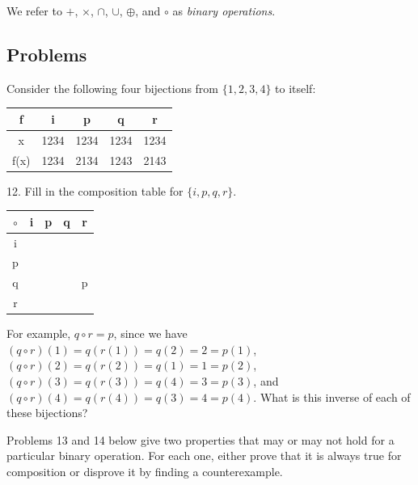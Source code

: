 \documentclass{article}
\newcommand{\0}{\mathbf 0}
\newcommand{\1}{\mathbf 1}
\begin{document}
We refer to $+$, $\times$, $\cap$, $\cup$, $\oplus$, and $\circ$ as \emph{binary operations}.


\subsection*{Problems}

Consider the following four bijections from $\{1,2,3,4\}$ to itself:

\begin{center}
\begin{tabular}{||c||c|c|c|c||}
\hline
  f  &   i  &   p  &   q  &   r  \\ 
\hline
\hline
  x  & 1234 & 1234 & 1234 & 1234 \\ 
\hline
f(x) & 1234 & 2134 & 1243 & 2143 \\ 
\hline
\end{tabular}
\end{center}

\begin{description}
  \item{12.} Fill in the composition table for $\{i,p,q,r\}$.
    \begin{center}
    \begin{tabular}{||c||c|c|c|c||}
    \hline
    $\circ$ & \quad i \quad & \quad p \quad & \quad q \quad & \quad r \quad \\
    \hline
    \hline
    i \quad &               &               &               &               \\ 
    \hline
    p \quad &               &               &               &               \\ 
    \hline
    q \quad &               &               &               & \quad p \quad \\ 
    \hline
    r \quad &               &               &               &               \\ 
    \hline
    \end{tabular}
    \end{center}

    For example, $q \circ r = p$, since we have $(q \circ r)(1) = q(r(1)) = q(2) = 2 = p(1)$, $(q \circ r)(2) = q(r(2)) = q(1) = 1 = p(2)$, $(q \circ r)(3) = q(r(3)) = q(4) = 3 = p(3)$, and $(q \circ r)(4) = q(r(4)) = q(3) = 4 = p(4)$. What is this inverse of each of these bijections?
\end{description}


Problems 13 and 14 below give two properties that may or may not hold for a particular binary operation. For each one, either prove that it is always true for composition or disprove it by finding a counterexample.
\end{document}
